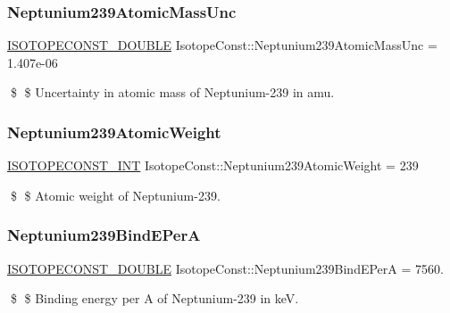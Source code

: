 \subsubsection{\texorpdfstring{Neptunium239\+Atomic\+Mass\+Unc}{Neptunium239AtomicMassUnc}}
{\footnotesize\ttfamily \mbox{\hyperlink{group___isotope_const-_macros_ga8f45a7272ce02c0b4c65c44636ed719a}{I\+S\+O\+T\+O\+P\+E\+C\+O\+N\+S\+T\+\_\+\+D\+O\+U\+B\+LE}} Isotope\+Const\+::\+Neptunium239\+Atomic\+Mass\+Unc = 1.\+407e-\/06}

\$ \$ Uncertainty in atomic mass of Neptunium-\/239 in amu. \mbox{\label{group___isotope_const-_neptunium-_np239_ga11e57ef5dda6d0c4e32ed56dcee7e2e3}} 
\subsubsection{\texorpdfstring{Neptunium239\+Atomic\+Weight}{Neptunium239AtomicWeight}}
{\footnotesize\ttfamily \mbox{\hyperlink{group___isotope_const-_macros_ga5f18360b3e99483a35c32d789e62621c}{I\+S\+O\+T\+O\+P\+E\+C\+O\+N\+S\+T\+\_\+\+I\+NT}} Isotope\+Const\+::\+Neptunium239\+Atomic\+Weight = 239}

\$ \$ Atomic weight of Neptunium-\/239. \mbox{\label{group___isotope_const-_neptunium-_np239_gae63ad7e9d05ab0d875a1e648bebaa583}} 
\subsubsection{\texorpdfstring{Neptunium239\+Bind\+E\+PerA}{Neptunium239BindEPerA}}
{\footnotesize\ttfamily \mbox{\hyperlink{group___isotope_const-_macros_ga8f45a7272ce02c0b4c65c44636ed719a}{I\+S\+O\+T\+O\+P\+E\+C\+O\+N\+S\+T\+\_\+\+D\+O\+U\+B\+LE}} Isotope\+Const\+::\+Neptunium239\+Bind\+E\+PerA = 7560.}

\$ \$ Binding energy per A of Neptunium-\/239 in keV. \mbox{\label{group___isotope_const-_neptunium-_np239_gacf769e187b972863618f15bb93fdb043}} 
